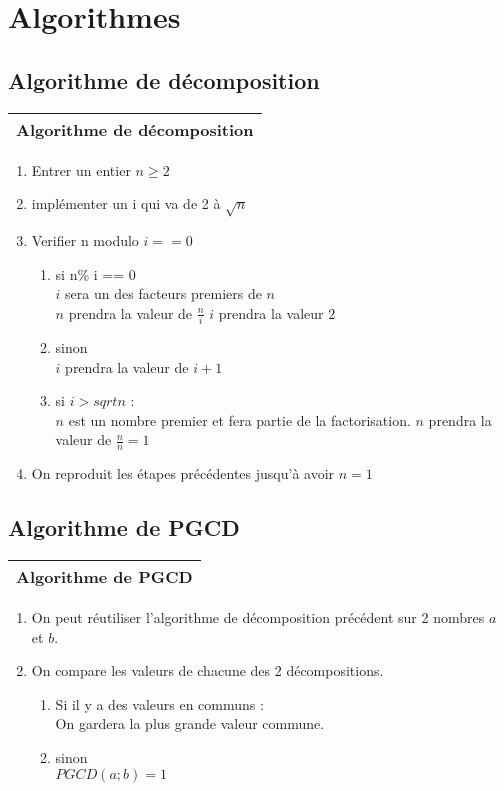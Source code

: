 \documentclass[titlepage]{article}
\begin{document}
\section{Algorithmes}

\subsection{Algorithme de décomposition}
\begin{tabular}{l}
\hline
Algorithme de décomposition\\
\hline 
\end{tabular}
\begin{enumerate}
\item Entrer un entier $n \geq 2$
\item implémenter un i qui va de 2 à $\sqrt{n}$
\item Verifier n modulo $i == 0$
\begin{enumerate}
\item si n\% i == 0\\
$i$ sera un des facteurs premiers de $n$\\
$n$ prendra la valeur de $\frac{n}{i}$
$i$ prendra la valeur $2$\\
\item sinon\\
$i$ prendra la valeur de $i + 1$
\item si $i > sqrt{n}$ :\\
$n$ est un nombre premier et fera partie de la factorisation.
$n$ prendra la valeur de $\frac{n}{n} = 1$
\end{enumerate}
\item On reproduit les étapes précédentes jusqu'à avoir $n = 1$
\end{enumerate}

\subsection{Algorithme de PGCD}
\begin{tabular}{l}
\hline
Algorithme de PGCD\\
\hline 
\end{tabular}
\begin{enumerate}
\item On peut réutiliser l'algorithme de décomposition précédent sur 2 nombres $a$ et $b$.
\item On compare les valeurs de chacune des 2 décompositions.
\begin{enumerate}
\item Si il y a des valeurs en communs :\\
On gardera la plus grande valeur commune.\\
\item sinon\\
$PGCD( a ; b ) = 1 $
\end{enumerate}
\end{enumerate}
\end{document}
